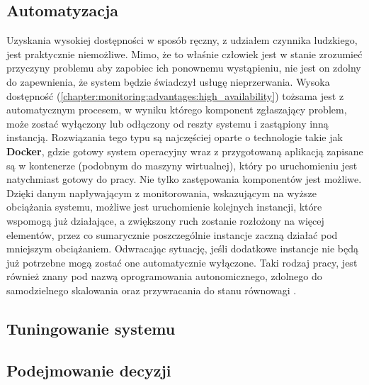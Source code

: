     \subsection{Automatyzacja}
    Uzyskania wysokiej dostępności w sposób ręczny, z udziałem czynnika ludzkiego, jest praktycznie niemożliwe.
    Mimo, że to właśnie człowiek jest w stanie zrozumieć przyczyny problemu aby zapobiec ich ponownemu wystąpieniu, 
    nie jest on zdolny do zapewnienia, że system będzie świadczył usługę nieprzerwania. Wysoka dostępność (\ref{chapter:monitoring:advantages:high_availability}) tożsama jest z automatycznym procesem, w wyniku którego
    komponent zgłaszający problem, może zostać wyłączony lub odłączony od reszty systemu i zastąpiony inną instancją.
    Rozwiązania tego typu są najczęściej oparte o technologie takie jak \textbf{Docker}, gdzie gotowy system
    operacyjny wraz z przygotowaną aplikacją zapisane są w kontenerze (podobnym do maszyny wirtualnej), który po 
    uruchomieniu jest natychmiast gotowy do pracy. Nie tylko zastępowania komponentów jest możliwe. Dzięki
    danym napływającym z monitorowania, wskazującym na wyższe obciążania systemu, możliwe jest uruchomienie
    kolejnych instancji, które wspomogą już działające, a zwiększony ruch zostanie rozłożony na więcej elementów,
    przez co sumarycznie poszczególnie instancje zaczną działać pod mniejszym obciążaniem. Odwracając sytuację, jeśli
    dodatkowe instancje nie będą już potrzebne mogą zostać one automatycznie wyłączone. Taki rodzaj pracy, jest również
    znany pod nazwą oprogramowania autonomicznego, zdolnego do samodzielnego skalowania oraz przywracania do stanu równowagi 
    \cite{monitoring_and_alerting}. 
    
    
    \subsection{Tuningowanie systemu}
    \subsection{Podejmowanie decyzji}